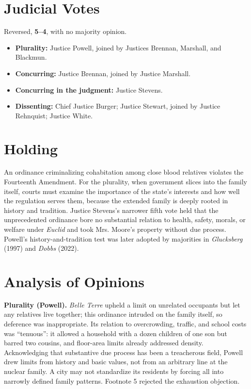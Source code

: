 \documentclass[12pt]{article}
\begin{document}
\section{Judicial Votes}

Reversed, \textbf{5--4}, with no majority opinion.
\begin{itemize}
\item \textbf{Plurality:} Justice Powell, joined by Justices Brennan, Marshall, and Blackmun.
\item \textbf{Concurring:} Justice Brennan, joined by Justice Marshall.
\item \textbf{Concurring in the judgment:} Justice Stevens.
\item \textbf{Dissenting:} Chief Justice Burger; Justice Stewart, joined by Justice Rehnquist; Justice White.
\end{itemize}

\section{Holding}

An ordinance criminalizing cohabitation among close blood relatives violates the Fourteenth Amendment. For the plurality, when government slices into the family itself, courts must examine the importance of the state's interests and how well the regulation serves them, because the extended family is deeply rooted in history and tradition. Justice Stevens's narrower fifth vote held that the unprecedented ordinance bore no substantial relation to health, safety, morals, or welfare under \textit{Euclid} and took Mrs. Moore's property without due process. Powell's history-and-tradition test was later adopted by majorities in \textit{Glucksberg} (1997) and \textit{Dobbs} (2022).

\section{Analysis of Opinions}

\textbf{Plurality (Powell).} \textit{Belle Terre} upheld a limit on unrelated occupants but let any relatives live together; this ordinance intruded on the family itself, so deference was inappropriate. Its relation to overcrowding, traffic, and school costs was ``tenuous'': it allowed a household with a dozen children of one son but barred two cousins, and floor-area limits already addressed density. Acknowledging that substantive due process has been a treacherous field, Powell drew limits from history and basic values, not from an arbitrary line at the nuclear family. A city may not standardize its residents by forcing all into narrowly defined family patterns. Footnote 5 rejected the exhaustion objection.
\end{document}
